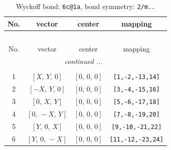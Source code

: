 \documentclass[fleqn,8pt]{jsarticle}
\begin{document}
\renewcommand{\arraystretch}{1.2}
\begin{longtable}{cccc}
\caption{Wyckoff bond: {\tt 6c@1a}, bond symmetry: {\tt 2/m..}}
 \\
 \hline \hline
No. & vector & center & mapping \\ \hline \endfirsthead

\multicolumn{3}{l}{\tablename\ \thetable{}} \\
 \hline \hline
No. & vector & center & mapping \\ \hline \endhead

 \hline \hline
\multicolumn{3}{r}{\footnotesize\it continued ...} \\ \endfoot

 \hline \hline
\multicolumn{3}{r}{} \\ \endlastfoot

1 & $\left[ X,\, Y,\, 0 \right]$ & $\left[ 0,\, 0,\, 0 \right]$ & {\tt [1,-2,-13,14]} \\ \hline
2 & $\left[ - X,\, Y,\, 0 \right]$ & $\left[ 0,\, 0,\, 0 \right]$ & {\tt [3,-4,-15,16]} \\ \hline
3 & $\left[ 0,\, X,\, Y \right]$ & $\left[ 0,\, 0,\, 0 \right]$ & {\tt [5,-6,-17,18]} \\ \hline
4 & $\left[ 0,\, - X,\, Y \right]$ & $\left[ 0,\, 0,\, 0 \right]$ & {\tt [7,-8,-19,20]} \\ \hline
5 & $\left[ Y,\, 0,\, X \right]$ & $\left[ 0,\, 0,\, 0 \right]$ & {\tt [9,-10,-21,22]} \\ \hline
6 & $\left[ Y,\, 0,\, - X \right]$ & $\left[ 0,\, 0,\, 0 \right]$ & {\tt [11,-12,-23,24]} \\
\end{longtable}
\renewcommand{\arraystretch}{1.2}
\end{document}
